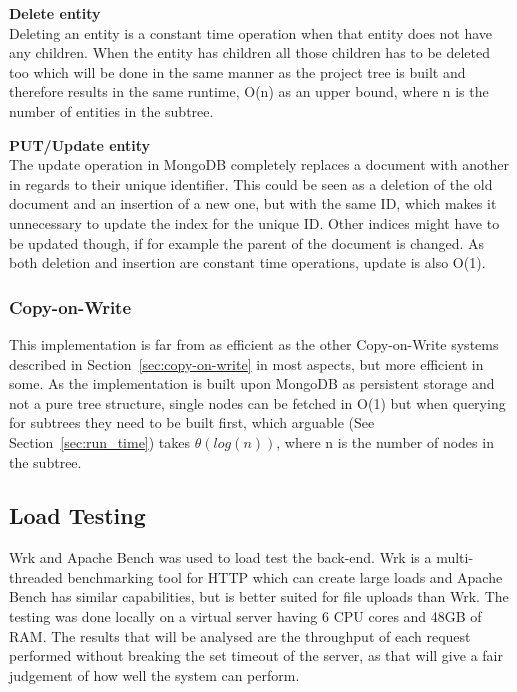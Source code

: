 \documentclass[a4paper,12pt]{article}
\begin{document}
\par \textbf{Delete entity} \\
Deleting an entity is a constant time operation when that entity does not have any children. When
the entity has children all those children has to be deleted too which will be done in the same
manner as the project tree is built and therefore results in the same runtime, O(n) as an upper
bound, where n is the number of entities in the subtree.\\

\par \textbf{PUT/Update entity} \\
The update operation in MongoDB completely replaces a document with another in regards to their
unique identifier. This could be seen as a deletion of the old document and an insertion of a new
one, but with the same ID, which makes it unnecessary to update the index for the unique ID. Other 
indices might have to be updated though, if for example the parent of the document is changed. 
As both deletion and insertion are constant time operations, update is also O(1).\\

\subsubsection{Copy-on-Write}
This implementation is far from as efficient as the other Copy-on-Write systems described in
Section~\ref{sec:copy-on-write} in most aspects, but more efficient in some. As the implementation
is built upon MongoDB as persistent storage and not a pure tree structure, single nodes can be
fetched in O(1) but when querying for subtrees they need to be built first, which arguable (See
Section~\ref{sec:run_time}) takes $\theta(log(n))$, where n is the number of nodes in the subtree. 

\newpage
\subsection{Load Testing} \label{sec:load_testing}
Wrk and Apache Bench was used to load test the back-end. Wrk is a multi-threaded benchmarking tool
for HTTP which can create large loads and Apache Bench has similar capabilities, but is better
suited for file uploads than Wrk. The testing was done locally on a virtual server having 6 CPU
cores and 48GB of RAM. The results that will be analysed are the throughput of each request
performed without breaking the set timeout of the server, as that will give a fair judgement of how
well the system can perform.
\end{document}
